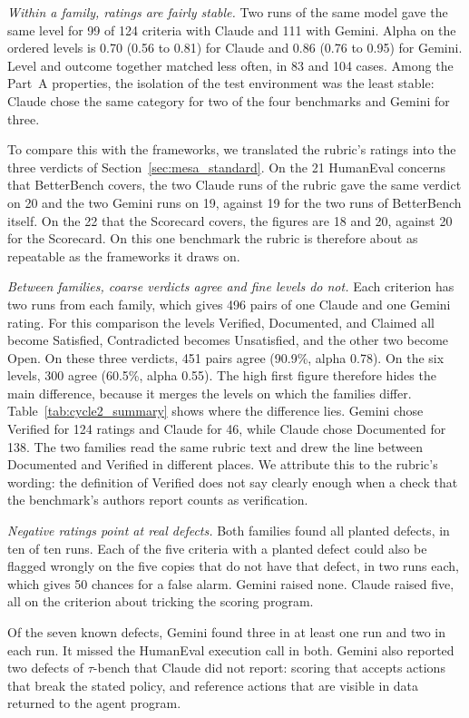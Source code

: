 \documentclass[runningheads]{llncs}
\begin{document}
\emph{Within a family, ratings are fairly stable.} Two runs of the same model gave the same level for 99 of 124 criteria with Claude and 111 with Gemini. Alpha on the ordered levels is 0.70 (0.56 to 0.81) for Claude and 0.86 (0.76 to 0.95) for Gemini. Level and outcome together matched less often, in 83 and 104 cases. Among the Part~A properties, the isolation of the test environment was the least stable: Claude chose the same category for two of the four benchmarks and Gemini for three.

To compare this with the frameworks, we translated the rubric's ratings into the three verdicts of Section~\ref{sec:mesa_standard}. On the 21 HumanEval concerns that BetterBench covers, the two Claude runs of the rubric gave the same verdict on 20 and the two Gemini runs on 19, against 19 for the two runs of BetterBench itself. On the 22 that the Scorecard covers, the figures are 18 and 20, against 20 for the Scorecard. On this one benchmark the rubric is therefore about as repeatable as the frameworks it draws on.

\emph{Between families, coarse verdicts agree and fine levels do not.} Each criterion has two runs from each family, which gives 496 pairs of one Claude and one Gemini rating. For this comparison the levels Verified, Documented, and Claimed all become Satisfied, Contradicted becomes Unsatisfied, and the other two become Open. On these three verdicts, 451 pairs agree (90.9\%, alpha 0.78). On the six levels, 300 agree (60.5\%, alpha 0.55). The high first figure therefore hides the main difference, because it merges the levels on which the families differ. Table~\ref{tab:cycle2_summary} shows where the difference lies. Gemini chose Verified for 124 ratings and Claude for 46, while Claude chose Documented for 138. The two families read the same rubric text and drew the line between Documented and Verified in different places. We attribute this to the rubric's wording: the definition of Verified does not say clearly enough when a check that the benchmark's authors report counts as verification.

\emph{Negative ratings point at real defects.} Both families found all planted defects, in ten of ten runs. Each of the five criteria with a planted defect could also be flagged wrongly on the five copies that do not have that defect, in two runs each, which gives 50 chances for a false alarm. Gemini raised none. Claude raised five, all on the criterion about tricking the scoring program.

Of the seven known defects, Gemini found three in at least one run and two in each run. It missed the HumanEval execution call in both. Gemini also reported two defects of $\tau$-bench that Claude did not report: scoring that accepts actions that break the stated policy, and reference actions that are visible in data returned to the agent program.
\end{document}
